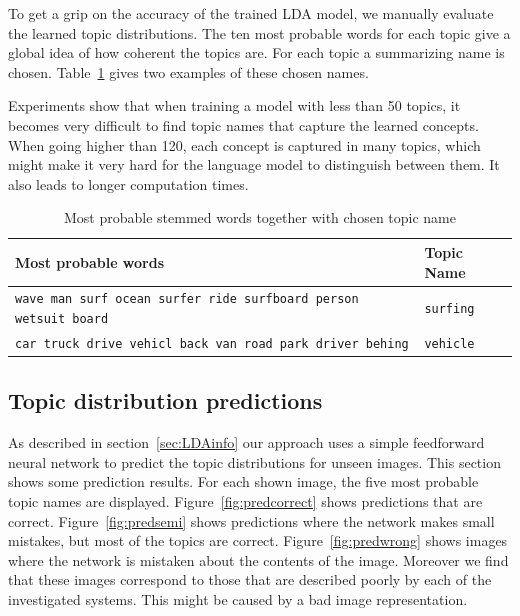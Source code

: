 \documentclass[twoside,twocolumn]{article}
\begin{document}
	To get a grip on the accuracy of the trained LDA model, we manually evaluate the learned topic distributions. The ten most probable words for each topic give a global idea of how coherent the topics are. For each topic a summarizing name is chosen. Table~\ref{tbl:woorden-naar-topic} gives two examples of these chosen names.
	
	Experiments show that when training a model with less than 50 topics, it becomes very difficult to find topic names that capture the learned concepts. When going higher than 120, each concept is captured in many topics, which might make it very hard for the language model to distinguish between them. It also leads to longer computation times. 
	
	\begin{table}[!t]
		\centering
		\begin{tabular}{ll}
			Most probable words                                               & Topic Name \\ \hline
			\texttt{\small{wave man surf ocean surfer ride surfboard person wetsuit board}} & \texttt{surfing}       \\
			\texttt{\small{car truck drive vehicl back van road park driver behing}}        & \texttt{vehicle}      \\
		\end{tabular}
		\caption{Most probable stemmed words together with chosen topic name}	\label{tbl:woorden-naar-topic}
	\end{table}
	
	\subsection{Topic distribution predictions}
	As described in section~\ref{sec:LDAinfo} our approach uses a simple feedforward neural network to predict the topic distributions for unseen images. This section shows some prediction results. For each shown image, the five most probable topic names are displayed. Figure~\ref{fig:predcorrect} shows predictions that are correct. Figure~\ref{fig:predsemi} shows predictions where the network makes small mistakes, but most of the topics are correct. Figure~\ref{fig:predwrong} shows images where the network is mistaken about the contents of the image. Moreover we find that these images correspond to those that are described poorly by each of the investigated systems. This might be caused by a bad image representation.
	
\end{document}
